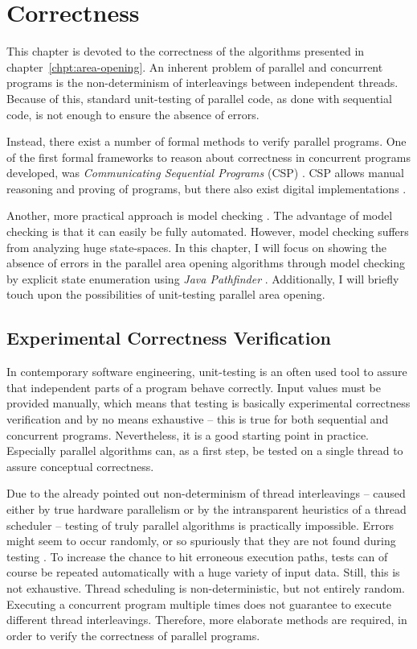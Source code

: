 \chapter{Correctness}
\label{chpt:correctness}

This chapter is devoted to the correctness of the algorithms presented in
chapter~\ref{chpt:area-opening}. An inherent problem of parallel and concurrent
programs is the non-determinism of interleavings between independent
threads. Because of this, standard unit-testing of parallel code, as done with
sequential code, is not enough to ensure the absence of errors.

Instead, there exist a number of formal methods to verify parallel programs. One
of the first formal frameworks to reason about correctness in concurrent
programs developed, was \emph{Communicating Sequential Programs} (CSP)
\cite{Hoare1978Communicating}. CSP allows manual reasoning and proving of
programs, but there also exist digital implementations \cite{Roscoe1997Theory}.

Another, more practical approach is model checking \cite{Visser2003Model}. The
advantage of model checking is that it can easily be fully automated. However,
model checking suffers from analyzing huge state-spaces. In this chapter, I will
focus on showing the absence of errors in the parallel area opening algorithms
through model checking by explicit state enumeration using \emph{Java
  Pathfinder} \cite{Visser2003Model}. Additionally, I will briefly touch upon
the possibilities of unit-testing parallel area opening.

\section{Experimental Correctness Verification}
\label{sec:correctness-experimental}

In contemporary software engineering, unit-testing is an often used tool to
assure that independent parts of a program behave correctly. Input values must
be provided manually, which means that testing is basically experimental
correctness verification and by no means exhaustive -- this is true for both
sequential and concurrent programs. Nevertheless, it is a good starting point in
practice. Especially parallel algorithms can, as a first step, be tested on a
single thread to assure conceptual correctness.

Due to the already pointed out non-determinism of thread interleavings -- caused
either by true hardware parallelism or by the intransparent heuristics of a
thread scheduler -- testing of truly parallel algorithms is practically
impossible. Errors might seem to occur randomly, or so spuriously that they are
not found during testing \cite{Goetz2006Java}. To increase the chance to hit
erroneous execution paths, tests can of course be repeated automatically with a
huge variety of input data. Still, this is not exhaustive. Thread scheduling is
non-deterministic, but not entirely random. Executing a concurrent program
multiple times does not guarantee to execute different thread
interleavings. Therefore, more elaborate methods are required, in order to
verify the correctness of parallel programs.

